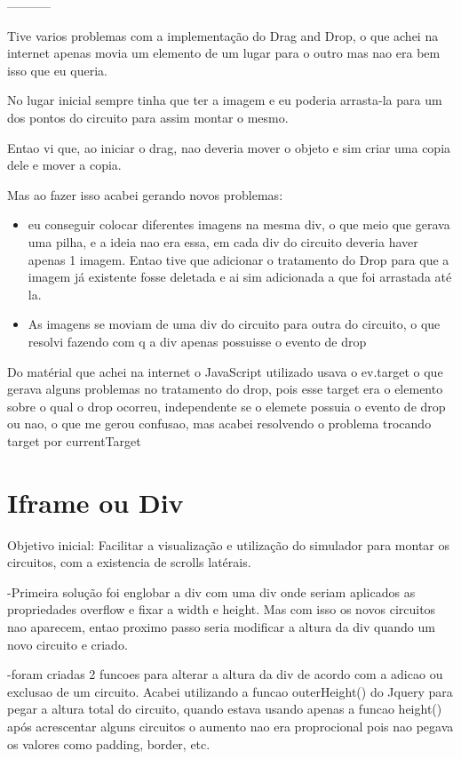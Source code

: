 \documentclass[a4paper, 12pt, oneside]{book}
\begin{document}
-----------

Tive varios problemas com a implementação do Drag and Drop, o que achei na internet apenas movia um elemento de um lugar para o outro mas nao era bem isso que eu queria.

No lugar inicial sempre tinha que ter a imagem e eu poderia arrasta-la para um dos pontos do circuito para assim montar o mesmo.

Entao vi que, ao iniciar o drag, nao deveria mover o objeto e sim criar uma copia dele e mover a copia.

Mas ao fazer isso acabei gerando novos problemas: 
\begin{itemize}
\item eu conseguir colocar diferentes imagens na mesma div, o que meio que gerava uma pilha, e a ideia nao era essa, em cada div do circuito deveria haver apenas 1 imagem. Entao tive que adicionar o tratamento do Drop para que a imagem já existente fosse deletada e ai sim adicionada a que foi arrastada até la.
\item As imagens se moviam de uma div do circuito para outra do circuito, o que resolvi fazendo com q a div apenas possuisse o evento de drop
\end{itemize}
	
Do matérial que achei na internet o JavaScript utilizado usava o ev.target o que gerava alguns problemas no tratamento do drop, pois esse target era o elemento sobre o qual o drop ocorreu, independente se o elemete possuia o evento de drop ou nao, o que me gerou confusao, mas acabei resolvendo o problema trocando target por currentTarget

\section{Iframe ou Div}

Objetivo inicial: Facilitar a visualização e utilização do simulador para montar os circuitos, com a existencia de scrolls latérais.

-Primeira solução foi englobar a div com uma div onde seriam aplicados as propriedades overflow e fixar a width e height. Mas com isso os novos circuitos nao aparecem, entao proximo passo seria modificar a altura da div quando um novo circuito e criado.

-foram criadas 2 funcoes para alterar a altura da div de acordo com a adicao ou exclusao de um circuito. Acabei utilizando a funcao outerHeight() do Jquery para pegar a altura total do circuito, quando estava usando apenas a funcao height() após acrescentar alguns circuitos o aumento nao era proprocional pois nao pegava os valores como padding, border, etc.
\end{document}
